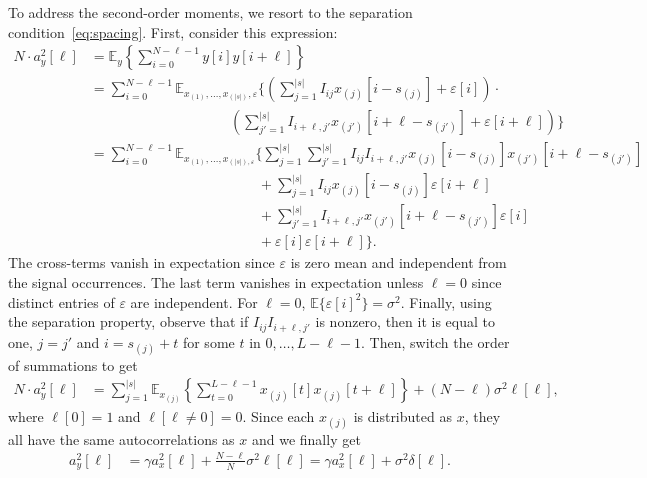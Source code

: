 \documentclass[12pt]{article}
\newcommand{\E}{\mathbb{E}}
\newcommand{\1}{\mathbf{1}}
\theoremstyle{plain}
\theoremstyle{definition}
\theoremstyle{remark}
\theoremstyle{plain}
\theoremstyle{remark}
\theoremstyle{plain}
\theoremstyle{plain}
\theoremstyle{plain}
\numberwithin{equation}{section}
\begin{document}
To address the second-order moments, we resort to the separation condition~\eqref{eq:spacing}. First, consider this expression:
\begin{align*}
N \cdot a_y^2[\ell] & = \E_y\left\{ \sum_{i = 0}^{N-\ell-1} y[i] y[i+\ell] \right\} \\
& = \sum_{i = 0}^{N-\ell-1} \E_{x_{(1)}, \ldots, x_{(|s|)}, \varepsilon}\Bigg\{ \left( \sum_{j = 1}^{|s|} I_{ij} x_{(j)}[i-s_{(j)}] + \varepsilon[i] \right) \cdot \\
& \qquad \qquad \qquad \qquad \qquad  \left( \sum_{j' = 1}^{|s|} I_{i+\ell,j'} x_{(j')}[i+\ell-s_{(j')}] + \varepsilon[i+\ell] \right)  \Bigg\} \\
& = \sum_{i = 0}^{N-\ell-1} \E_{x_{(1)}, \ldots, x_{(|s|), \varepsilon}}\Bigg\{ \sum_{j = 1}^{|s|} \sum_{j' = 1}^{|s|} I_{ij}  I_{i+\ell,j'} x_{(j)}[i-s_{(j)}]  x_{(j')}[i+\ell-s_{(j')}] \\
& \qquad \qquad \qquad \qquad \qquad \qquad + \sum_{j = 1}^{|s|} I_{ij} x_{(j)}[i-s_{(j)}] \varepsilon[i+\ell] \\
& \qquad \qquad \qquad \qquad \qquad \qquad + \sum_{j' = 1}^{|s|} I_{i+\ell,j'} x_{(j')}[i+\ell-s_{(j')}] \varepsilon[i] \\
& \qquad \qquad \qquad \qquad \qquad \qquad + \varepsilon[i] \varepsilon[i + \ell] \Bigg\}.
\end{align*}
The cross-terms vanish in expectation since $\varepsilon$ is zero mean and independent from the signal occurrences. The last term vanishes in expectation unless $\ell = 0$ since distinct entries of $\varepsilon$ are independent. For $\ell = 0$, $\E\{\varepsilon[i]^2\} = \sigma^2$. Finally, using the separation property, observe that if $I_{ij}  I_{i+\ell,j'}$ is nonzero, then it is equal to one, $j = j'$ and $i = s_{(j)} + t$ for some $t$ in $0, \ldots, L-\ell-1$. Then, switch the order of summations to get
\begin{align}
N \cdot a_y^2[\ell] & = \sum_{j=1}^{|s|} \E_{x_{(j)}}\left\{ \sum_{t = 0}^{L-\ell-1} x_{(j)}[t] x_{(j)}[t+\ell] \right\} + (N-\ell)\sigma^2 \ell[\ell],
\end{align}
where $\ell[0] = 1$ and $\ell[\ell \neq 0] = 0$. Since each $x_{(j)}$ is distributed as $x$, they all have the same autocorrelations as $x$ and we finally get
\begin{align}
a_y^2[\ell] & = \gamma a_x^2[\ell] + \frac{N-\ell}{N}\sigma^2 \ell[\ell] = \gamma a_x^2[\ell] + \sigma^2 \delta[\ell].
\end{align}
\end{document}
